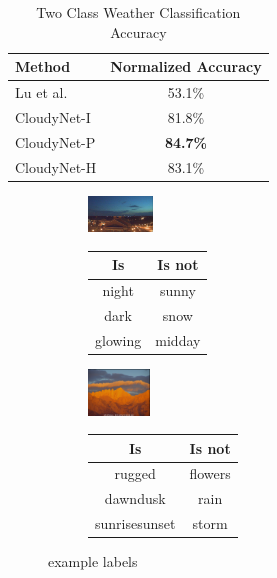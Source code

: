 \documentclass{article}
\begin{document}
\begin{table}[t]
	\centering
	\begin{tabular}{ | l | c | }
		\hline
			Method & Normalized Accuracy \\ \hline
			Lu et al.~\cite{lutwoclass}& 53.1\% \\ \hline
			CloudyNet-I & 81.8\% \\ \hline
			CloudyNet-P & \textbf{84.7\%} \\ \hline
			CloudyNet-H & 83.1\% \\ 
		\hline
	\end{tabular}
	\caption{Two Class Weather Classification Accuracy}
	\label{tbl:twoclass}
\end{table}

\begin{figure}[t]
  \centering
  \begin{subfigure}
    \centering
    \includegraphics[width=0.19\textwidth]{figs/labels_1.jpg}
    \begin{tabular}[b]{| c | c |}
        \hline
        Is & Is not \\
        \hline
        night & sunny \\
        dark & snow \\
        glowing & midday \\
        \hline
    \end{tabular}
  \end{subfigure}
  \begin{subfigure}
    \centering
    \includegraphics[width=0.18\textwidth]{figs/labels_2.jpg}
    \begin{tabular}[b]{| c | c |}
        \hline
        Is & Is not \\
        \hline
        rugged & flowers \\
        dawndusk & rain \\
        sunrisesunset & storm \\
        \hline
    \end{tabular}
  \end{subfigure}
  \caption{example labels}
  \label{fig:labels}
\end{figure}
\end{document}
